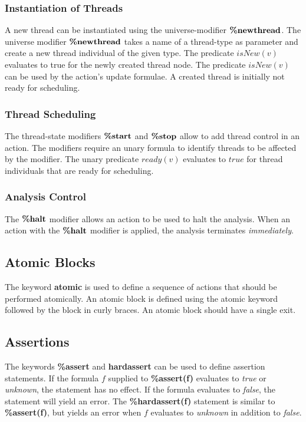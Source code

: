 \subsubsection{Instantiation of Threads}

A new thread can be instantiated using the universe-modifier
$\textbf{\%newthread}$. The universe modifier $\textbf{\%newthread}$ takes a name of a
thread-type as parameter and create a new thread individual of the
given type. The predicate $isNew(v)$ evaluates to true for the
newly created thread node. The predicate $isNew(v)$ can be used by
the action's update formulae. A created thread is initially not
ready for scheduling.

\subsubsection{Thread Scheduling}

The thread-state modifiers $\textbf{\%start}$ and $\textbf{\%stop}$ allow to add
thread control in an action. The modifiers require an unary
formula to identify threads to be affected by the modifier. The
unary predicate $ready(v)$ evaluates to $true$ for thread
individuals that are ready for scheduling.

\subsubsection{Analysis Control}

The $\textbf{\%halt}$ modifier allows an action to be used to halt the
analysis. When an action with the $\textbf{\%halt}$ modifier is applied,
the analysis terminates \emph{immediately}.


\subsection{Atomic Blocks}\label{Se:Atomic}

The keyword \textbf{atomic} is used to define a sequence of
actions that should be performed atomically. An atomic block is
defined using the atomic keyword followed by the block in curly
braces. An atomic block should have a single exit.

\subsection{Assertions}

The keywords \textbf{\%assert} and \textbf{hardassert} can be used
to define assertion statements. If the formula $f$ supplied to
\textbf{\%assert(f)} evaluates to \emph{true} or \emph{unknown},
the statement has no effect. If the formula evaluates to
\emph{false}, the statement will yield an error. The
\textbf{\%hardassert(f)} statement is similar to
\textbf{\%assert(f)}, but yields an error when $f$ evaluates to
\emph{unknown} in addition to \emph{false}.

